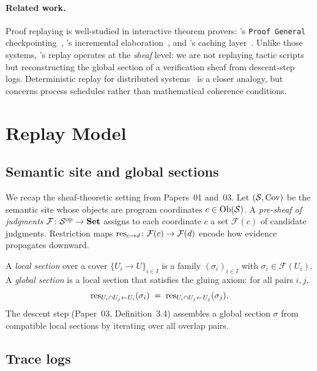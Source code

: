\documentclass[11pt]{article}
\newcommand{\GS}{\sigma}                   %
\begin{document}
\paragraph{Related work.}
Proof replaying is well-studied in interactive theorem provers: \Coq's
\texttt{Proof General} checkpointing~\cite{coq-ref}, \LEAN's
incremental elaboration~\cite{lean-ref}, and \Dafny's caching
layer~\cite{dafny-ref}.  Unlike those systems, \JuGeo's replay
operates at the \emph{sheaf} level: we are not replaying tactic scripts
but reconstructing the global section of a verification sheaf from
descent-step logs.  Deterministic replay for distributed
systems~\cite{det-replay} is a closer analogy, but concerns process
schedules rather than mathematical coherence conditions.


\section{Replay Model}
\label{sec:replay-model}

\subsection{Semantic site and global sections}

We recap the sheaf-theoretic setting from Papers~01 and~03.  Let
$(\mathcal{S}, \mathrm{Cov})$ be the \JuGeo{} semantic site whose objects are program
coordinates $c \in \mathrm{Ob}(\mathcal{S})$.  A \emph{pre-sheaf of judgments}
$\mathcal{F}\colon \mathcal{S}^{\mathrm{op}} \to \mathbf{Set}$ assigns to
each coordinate $c$ a set $\mathcal{F}(c)$ of candidate judgments.
Restriction maps $\mathrm{res}_{c \to d}\colon \mathcal{F}(c) \to \mathcal{F}(d)$
encode how evidence propagates downward.

A \emph{local section} over a cover $\{U_i \to U\}_{i \in I}$ is a
family $(\GS_i)_{i \in I}$ with $\GS_i \in \mathcal{F}(U_i)$.  A
\emph{global section} is a local section that satisfies the gluing
axiom: for all pairs $i,j$,
\[
  \res_{U_i \cap U_j \leftarrow U_i}(\GS_i)
  \;=\;
  \res_{U_i \cap U_j \leftarrow U_j}(\GS_j).
\]
The \GLUE{} descent step (Paper~03, Definition~3.4) assembles a global
section $\GS$ from compatible local sections by iterating over all
overlap pairs.

\subsection{Trace logs}
\end{document}
